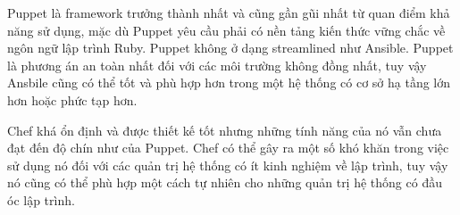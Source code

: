 Puppet là framework trưởng thành nhất và cũng gần gũi nhất từ quan điểm khả năng sử dụng, mặc dù Puppet yêu cầu phải có nền tảng kiến thức vững chắc về ngôn ngữ lập trình Ruby. Puppet không ở dạng streamlined như Ansible. Puppet là phương án an toàn nhất đối với các môi trường không đồng nhất, tuy vậy Ansbile cũng có thể tốt và phù hợp hơn trong một hệ thống có cơ sở hạ tầng lớn hơn hoặc phức tạp hơn.

Chef khá ổn định và được thiết kế tốt nhưng những tính năng của nó vẫn chưa đạt đến độ chín như của Puppet. Chef có thể gây ra một số khó khăn trong việc sử dụng nó đối với các quản trị hệ thống có ít kinh nghiệm về lập trình, tuy vậy nó cũng có thể phù hợp một cách tự nhiên cho những quản trị hệ thống có đầu óc lập trình.

\newpage
\clearpage

